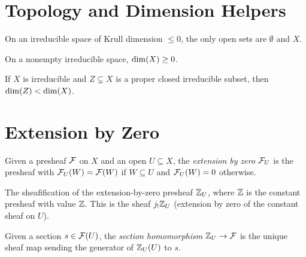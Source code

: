 \chapter{Topology and Dimension Helpers}\label{ch:auxiliary}

\begin{lemma}\label{lem:opens_eq_bot_or_top}
  \leanok
  On an irreducible space of Krull dimension $\le 0$, the only open sets
  are $\emptyset$ and $X$.
\end{lemma}

\begin{lemma}\label{lem:dim_nonneg_irreducible}
  \leanok
  On a nonempty irreducible space, $\operatorname{dim}(X) \ge 0$.
\end{lemma}

\begin{lemma}\label{lem:dim_lt_of_closed}
  \leanok
  If $X$ is irreducible and $Z \subsetneq X$ is a proper closed irreducible subset,
  then $\operatorname{dim}(Z) < \operatorname{dim}(X)$.
\end{lemma}


\chapter{Extension by Zero}\label{ch:zeroOutside}

\begin{definition}\label{def:zeroOutside}
  \leanok
  Given a presheaf $\mathcal{F}$ on $X$ and an open $U \subseteq X$, the
  \emph{extension by zero} $\mathcal{F}_U$ is the presheaf with
  $\mathcal{F}_U(W) = \mathcal{F}(W)$ if $W \subseteq U$ and $\mathcal{F}_U(W) = 0$ otherwise.
\end{definition}

\begin{definition}\label{def:zeroOutsideInt}
  \leanok
  The sheafification of the extension-by-zero presheaf $\mathbb{Z}_U$, where
  $\mathbb{Z}$ is the constant presheaf with value $\mathbb{Z}$.
  This is the sheaf $j_! \mathbb{Z}_U$ (extension by zero of the constant sheaf
  on $U$).
\end{definition}

\begin{definition}\label{def:sHom}
  \leanok
  Given a section $s \in \mathcal{F}(U)$, the \emph{section homomorphism}
  $\mathbb{Z}_U \to \mathcal{F}$ is the unique sheaf map sending the generator of $\mathbb{Z}_U(U)$ to $s$.
\end{definition}

